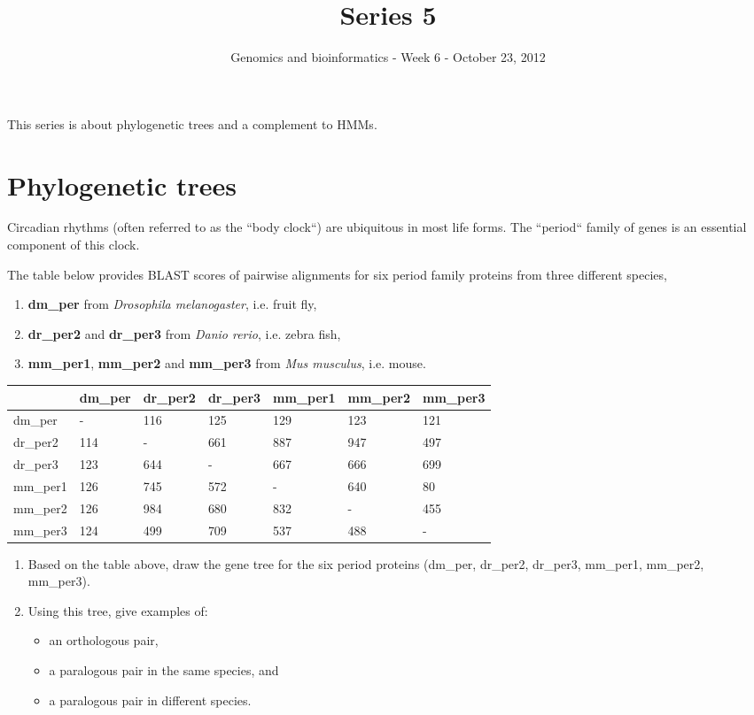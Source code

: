 \documentclass[a4paper,11pt]{article}
\title{Series 5}
\date{}
\author{Genomics and bioinformatics - Week 6 - October 23, 2012}
\begin{document}
\maketitle

This series is about phylogenetic trees and a complement to HMMs.

\section{Phylogenetic trees}

Circadian rhythms (often referred to as the ``body clock``) are
ubiquitous in most life forms. The ``period`` family of genes is an 
essential component of this clock.

The table below provides BLAST scores of pairwise
alignments for six period family proteins from three different
species, 

\begin{enumerate}
\item {\bf dm\_per} from {\it Drosophila melanogaster}, i.e. fruit fly,
\item {\bf dr\_per2} and {\bf dr\_per3} from {\it Danio rerio}, i.e. zebra fish,
\item {\bf mm\_per1}, {\bf mm\_per2} and {\bf mm\_per3} from {\it Mus
  musculus}, i.e. mouse.
\end{enumerate}

\begin{center}
	\begin{tabular} {| l || l | l | l | l | l | l |}
	\hline
 	& dm\_per & dr\_per2 & dr\_per3 & mm\_per1 & mm\_per2 & mm\_per3 \\ \hline\hline
	dm\_per & -  & 116 & 125 & 129 & 123 & 121 \\	\hline
	dr\_per2 &	114 & - & 661 & 887 & 947& 497 \\	\hline
	dr\_per3 & 123 & 644 & - & 667 & 666 & 699 \\	\hline
	mm\_per1 & 126 & 745 & 572 & - & 640 & 80 \\	\hline
	mm\_per2 & 126 & 984 & 680 & 832 & - & 455 \\	\hline
	mm\_per3 & 124 & 499 & 709 & 537 & 488 & - \\
	\hline
	\end{tabular}
\end{center}
\vspace{0.05 cm}

\begin{enumerate}
\item Based on the table above, draw the gene tree for the six period
  proteins (dm\_per, dr\_per2, dr\_per3,  mm\_per1, mm\_per2,
  mm\_per3). 
\item Using this tree, give examples of:
  \begin{itemize} 
  \item an orthologous pair, 
  \item a paralogous pair in the same species, and 
  \item a paralogous pair in different species.
  \end{itemize}
\end{enumerate}
\end{document}
